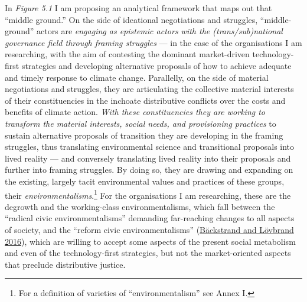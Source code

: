 \documentclass[a4paper, nobind]{templates/ociamthesis}
\begin{document}
In \emph{Figure 5.1} I am proposing an analytical framework that maps out that ``middle ground.'' On the side of ideational negotiations and struggles, ``middle-ground'' actors are \emph{engaging as epistemic actors with the (trans/sub)national governance field through framing struggles} --- in the case of the organisations I am researching, with the aim of contesting the dominant market-driven technology-first strategies and developing alternative proposals of how to achieve adequate and timely response to climate change. Parallelly, on the side of material negotiations and struggles, they are articulating the collective material interests of their constituencies in the inchoate distributive conflicts over the costs and benefits of climate action. \emph{With these constituencies they are working to transform the material interests, social needs, and provisioning practices} to sustain alternative proposals of transition they are developing in the framing struggles, thus translating environmental science and transitional proposals into lived reality --- and conversely translating lived reality into their proposals and further into framing struggles. By doing so, they are drawing and expanding on the existing, largely tacit environmental values and practices of these groups, their \emph{environmentalisms}.\footnote{For a definition of varieties of ``environmentalism'' see Annex I.} For the organisations I am researching, these are the degrowth and the working-class environmentalisms, which fall between the ``radical civic environmentalisms'' demanding far-reaching changes to all aspects of society, and the ``reform civic environmentalisms'' (\protect\hyperlink{ref-backstrand_climate_2016}{Bäckstrand and Lövbrand 2016}), which are willing to accept some aspects of the present social metabolism and even of the technology-first strategies, but not the market-oriented aspects that preclude distributive justice.
\end{document}
